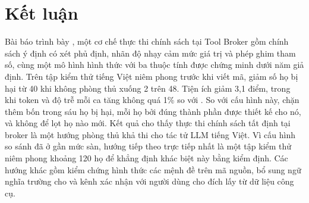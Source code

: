 \section{Kết luận}\label{sec:conclusion}

Bài báo trình bày \ours, một cơ chế thực thi chính sách tại Tool Broker gồm chính sách ý định có xét phủ định, nhãn độ
nhạy cảm mức giá trị và phép ghim tham số, cùng một mô hình hình thức với ba thuộc tính được chứng minh dưới năm giả định.
Trên tập kiểm thử tiếng Việt niêm phong trước khi viết mã, \ours{} giảm số họ bị hại từ 40 khi không phòng thủ xuống 2
trên 48. Tiện ích giảm 3,1 điểm, trong khi token và độ trễ mỗi ca tăng không quá 1\% so với \strSand. So với cấu hình
này, \ours{} chặn thêm bốn trong sáu họ bị hại, mỗi họ bởi đúng thành phần được thiết kế cho nó, và không để lọt họ nào
mới. Kết quả cho thấy thực thi chính sách tất định tại broker là một hướng phòng thủ khả thi cho tác tử LLM tiếng Việt. Vì
cấu hình so sánh đã ở gần mức sàn, hướng
tiếp theo trực tiếp nhất là một tập kiểm thử niêm phong khoảng 120 họ để khẳng định khác biệt này bằng kiểm định. Các
hướng khác gồm kiểm chứng hình thức các mệnh đề trên mã nguồn, bổ sung ngữ nghĩa trường cho \pThree{} và kênh xác nhận
với người dùng cho đích lấy từ dữ liệu công cụ.

